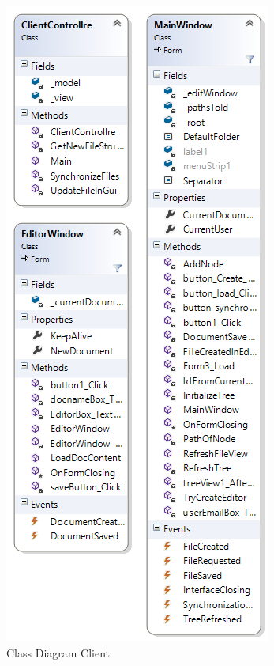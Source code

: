 \begin{figure}[H]
  \includegraphics[width=\textwidth]{illustrations/classDiagrams/offlineCD.png}
  \caption{Class Diagram Client}
  \label{classdiagramclient}
\end{figure}
